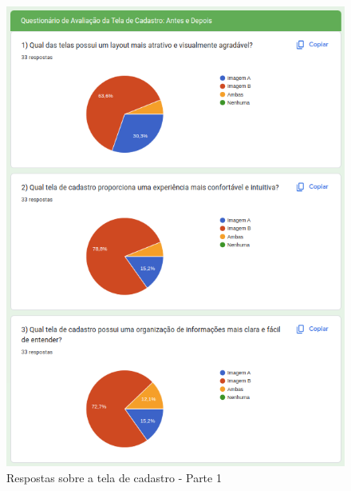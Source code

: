 \begin{figure}[!h]
	\begin{center}
	    \includegraphics[scale=0.7]{figs/Answers/Students/08.png}
	\end{center}
	\caption{\label{APB_TC01}Respostas sobre a tela de cadastro - Parte 1}
\end{figure}

\newpage


